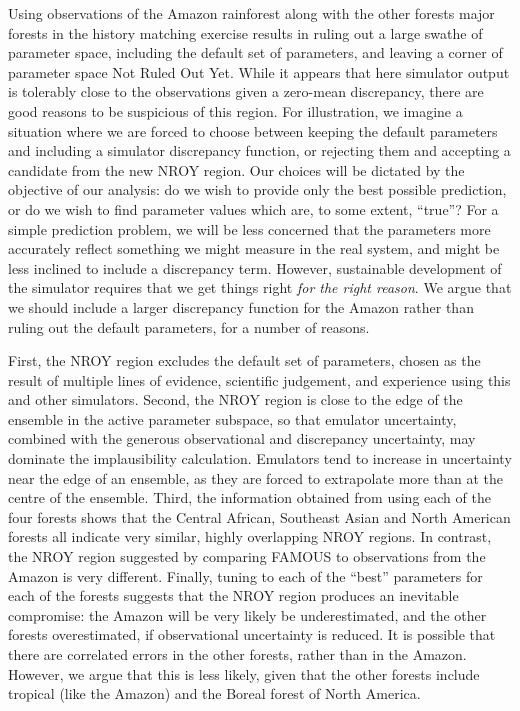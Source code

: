 \documentclass[esd, manuscript]{copernicus}
\begin{document}
Using observations of the Amazon rainforest along with the other forests major forests in the history matching exercise results in ruling out a large swathe of parameter space, including the default set of parameters, and leaving a corner of parameter space Not Ruled Out Yet. While it appears that here simulator output is tolerably close to the observations given a zero-mean discrepancy, there are good reasons to be suspicious of this region. For illustration, we imagine a situation where we are forced to choose between keeping the default parameters and including a simulator discrepancy function, or rejecting them and accepting a candidate from the new NROY region. Our choices will be dictated by the objective of our analysis: do we wish to provide only the best possible prediction, or do we wish to find parameter values which are, to some extent, ``true''? For a simple prediction problem, we will be less concerned that the parameters more accurately reflect something we might measure in the real system, and might be less inclined to include a discrepancy term. However, sustainable development of the simulator requires that we get things right \emph{for the right reason}. We argue that we should include a larger discrepancy function for the Amazon rather than ruling out the default parameters, for a number of reasons. 

First, the NROY region excludes the default set of parameters, chosen as the result of multiple lines of evidence, scientific judgement, and experience using this and other simulators. Second, the NROY region is close to the edge of the ensemble in the active parameter subspace, so that emulator uncertainty, combined with the generous observational and discrepancy uncertainty, may dominate the implausibility calculation. Emulators tend to increase in uncertainty near the edge of an ensemble, as they are forced to extrapolate more than at the centre of the ensemble. Third, the information obtained from using each of the four forests shows that the Central African, Southeast Asian and North American forests all indicate very similar, highly overlapping NROY regions. In contrast, the NROY region suggested by comparing FAMOUS to observations from the Amazon is very different. Finally, tuning to each of the ``best'' parameters for each of the forests suggests that the NROY region produces an inevitable compromise: the Amazon will be very likely be underestimated, and the other forests overestimated, if observational uncertainty is reduced. It is possible that there are correlated errors in the other forests, rather than in the Amazon. However, we argue that this is less likely, given that the other forests include tropical (like the Amazon) and the Boreal forest of North America.
\end{document}
